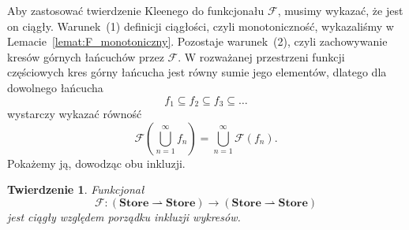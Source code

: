 \documentclass[11pt,a4paper]{article}
\theoremstyle{definition}
\theoremstyle{plain}
\newtheorem{twierdzenie}[definicja]{Twierdzenie}
\newcommand{\Store}{\textbf{Store}}
\begin{document}
Aby zastosować twierdzenie Kleenego do funkcjonału $\mathcal{F}$, musimy
wykazać, że jest on ciągły. Warunek~(1) definicji ciągłości, czyli
monotoniczność, wykazaliśmy w Lemacie~\ref{lemat:F_monotoniczny}.
Pozostaje warunek~(2), czyli zachowywanie kresów górnych łańcuchów przez $\mathcal{F}$. W rozważanej przestrzeni funkcji częściowych kres
górny łańcucha jest równy sumie jego elementów, dlatego dla dowolnego
łańcucha
\[
f_1\subseteq f_2\subseteq f_3\subseteq\ldots
\]
wystarczy wykazać równość
\[
\mathcal{F}
\left(
\bigcup_{n=1}^{\infty}f_n
\right)
=
\bigcup_{n=1}^{\infty}\mathcal{F}(f_n).
\]
Pokażemy ją, dowodząc obu inkluzji.

\begin{twierdzenie}\label{tw:F_ciagly}
	Funkcjonał
	\[
	\mathcal{F}:
	(\Store\rightharpoonup\Store)
	\longrightarrow
	(\Store\rightharpoonup\Store)
	\]
	jest ciągły względem porządku inkluzji wykresów.
\end{twierdzenie}
\end{document}

